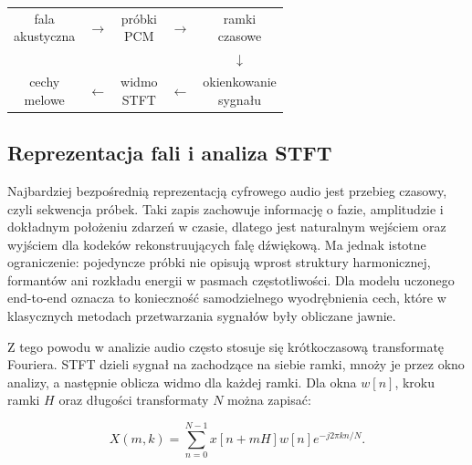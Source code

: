 \begin{center}
\footnotesize
\setlength{\tabcolsep}{3pt}
\begin{tabular}{c c c c c}
\fbox{\parbox{0.16\textwidth}{\centering fala\\akustyczna}} &
\(\rightarrow\) &
\fbox{\parbox{0.17\textwidth}{\centering próbki\\PCM}} &
\(\rightarrow\) &
\fbox{\parbox{0.18\textwidth}{\centering ramki\\czasowe}} \\
& & & & \(\downarrow\) \\
\fbox{\parbox{0.17\textwidth}{\centering cechy\\melowe}} &
\(\leftarrow\) &
\fbox{\parbox{0.17\textwidth}{\centering widmo\\STFT}} &
\(\leftarrow\) &
\fbox{\parbox{0.18\textwidth}{\centering okienkowanie\\sygnału}} \\
\end{tabular}
\label{fig:cyfrowa-reprezentacja-audio}
\end{center}

\subsection{Reprezentacja fali i analiza STFT}
\label{subsec:reprezentacja-fali-stft}

Najbardziej bezpośrednią reprezentacją cyfrowego audio jest przebieg czasowy, czyli sekwencja próbek. Taki zapis zachowuje informację o fazie, amplitudzie i dokładnym położeniu zdarzeń w czasie, dlatego jest naturalnym wejściem oraz wyjściem dla kodeków rekonstruujących falę dźwiękową. Ma jednak istotne ograniczenie: pojedyncze próbki nie opisują wprost struktury harmonicznej, formantów ani rozkładu energii w pasmach częstotliwości. Dla modelu uczonego end-to-end oznacza to konieczność samodzielnego wyodrębnienia cech, które w klasycznych metodach przetwarzania sygnałów były obliczane jawnie.

Z tego powodu w analizie audio często stosuje się krótkoczasową transformatę Fouriera. STFT dzieli sygnał na zachodzące na siebie ramki, mnoży je przez okno analizy, a następnie oblicza widmo dla każdej ramki. Dla okna \(w[n]\), kroku ramki \(H\) oraz długości transformaty \(N\) można zapisać:

\begin{equation}
    X(m,k) = \sum_{n=0}^{N-1} x[n + mH] w[n] e^{-j2\pi kn/N}.
\end{equation}

